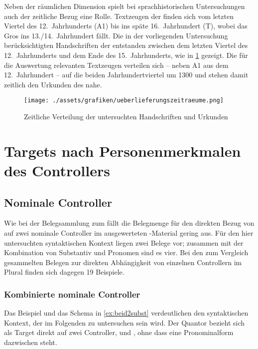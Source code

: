 Neben der räumlichen Dimension spielt bei sprachhistorischen Untersuchungen
auch der zeitliche Bezug eine Rolle. Textzeugen der \KC{} finden sich vom
letzten Viertel des 12.~Jahrhunderts (A1) bis ins späte
16.~Jahrhundert (T), wobei das Gros ins 13./14.~Jahrhundert fällt.
Die in der vorliegenden Untersuchung berücksichtigten Handschriften der
\KC{} entstanden zwischen dem letzten Viertel des 12.~Jahrhunderts und dem
Ende des 15.~Jahrhunderts, wie in \cref{fig:zeitstrahl} gezeigt. Die für die
Auswertung relevanten Textzeugen verteilen sich -- neben A1 aus dem
12.~Jahrhundert -- auf die beiden Jahrhundertviertel um 1300 und stehen damit
zeitlich den Urkunden des \CAO{} nahe.

\begin{figure}[p]
\centering
\texttt{[image: ./assets/grafiken/ueberlieferungszeitraeume.png]}
\caption{Zeitliche Verteilung der untersuchten Handschriften und Urkunden}
\label{fig:zeitstrahl}
\end{figure}

\section{Targets nach Personenmerkmalen des Controllers}
\label{sec:kctargpers}

\subsection{Nominale Controller}

Wie bei der Belegsammlung zum \CAO{} fällt die Belegmenge für den
direkten Bezug von  auf zwei nominale Controller im ausgewerteten
\KC{}-Material gering aus. Für den hier untersuchten syntaktischen Kontext
liegen zwei Belege vor; zusammen mit der Kombination von Substantiv und
Pronomen sind es vier. Bei den zum Vergleich gesammelten Belegen zur direkten
Abhängigkeit von einzelnen Controllern im Plural finden sich dagegen 19
Beispiele.

\subsubsection{Kombinierte nominale Controller}
\label{subsubsec:conomctrlpers}

Das Beispiel und das Schema in \cref{ex:beid2subst} verdeutlichen den
syntaktischen Kontext, der im Folgenden zu untersuchen sein wird. Der Quantor
 bezieht sich als Target direkt auf zwei Controller,
 und , ohne dass eine Pronominalform dazwischen
steht.

